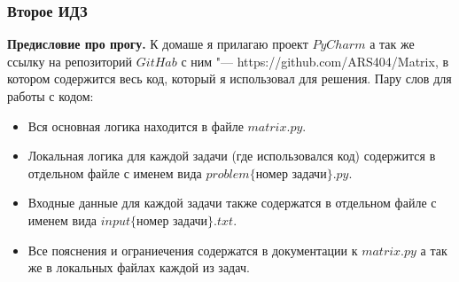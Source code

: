 \subsubsection{Второе ИДЗ}

\textbf{Предисловие про прогу.} К домаше я прилагаю проект $PyCharm$ а так же ссылку на репозиторий $GitHab$ с ним "--- https://github.com/ARS404/Matrix, в котором содержится весь код, который я использовал для решения. Пару слов для работы с кодом:
\begin{itemize}
    \item Вся основная логика находится в файле $matrix.py$.
    \item Локальная логика для каждой задачи (где использовался код) содержится в отдельном файле с именем вида $problem\{\textit{номер задачи}\}.py$.
    \item Входные данные для каждой задачи также содержатся в отдельном файле с именем вида $input\{\textit{номер задачи}\}.txt$.
    \item Все пояснения и ограниечения содержатся в документации к $matrix.py$ а так же в локальных файлах каждой из задач.
\end{itemize}

